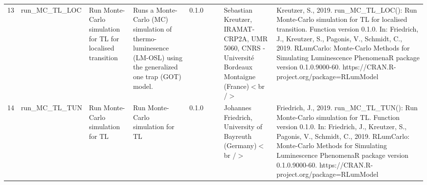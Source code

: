 \begin{table}[ht]
\begin{tabular}{rllllllll}
 \\ 
  13 & run\_MC\_TL\_LOC & Run Monte-Carlo simulation for TL for localised transition & Runs a Monte-Carlo (MC) simulation of thermo-luminesence (LM-OSL) using the generalized one trap (GOT) model. & 0.1.0
 &  &  & Sebastian Kreutzer, IRAMAT-CRP2A, UMR 5060, CNRS - Université Bordeaux Montaigne (France)$<$br /$>$ & Kreutzer, S., 2019. run\_MC\_TL\_LOC(): Run Monte-Carlo simulation for TL for localised transition. Function version 0.1.0. In: Friedrich, J., Kreutzer, S., Pagonis, V., Schmidt, C., 2019. RLumCarlo: Monte-Carlo Methods for Simulating Luminescence PhenomenaR package version 0.1.0.9000-60. https://CRAN.R-project.org/package=RLumModel
 \\ 
  14 & run\_MC\_TL\_TUN & Run Monte-Carlo simulation for TL & Run Monte-Carlo simulation for TL & 0.1.0
 &  &  & Johannes Friedrich, University of Bayreuth (Germany)$<$br /$>$ & Friedrich, J., 2019. run\_MC\_TL\_TUN(): Run Monte-Carlo simulation for TL. Function version 0.1.0. In: Friedrich, J., Kreutzer, S., Pagonis, V., Schmidt, C., 2019. RLumCarlo: Monte-Carlo Methods for Simulating Luminescence PhenomenaR package version 0.1.0.9000-60. https://CRAN.R-project.org/package=RLumModel
 \\ 
   \hline
\end{tabular}
\end{table}

